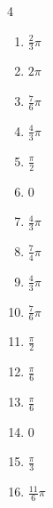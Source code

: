 \begin{multicols}{4}
\begin{enumerate}
  \item $\displaystyle \frac{2}{3}\pi$

  \item $\displaystyle 2\pi$

  \item $\displaystyle \frac{7}{6}\pi$

  \item $\displaystyle \frac{4}{3}\pi$

  \item $\displaystyle \frac{\pi}{2}$

  \item $\displaystyle 0$

  \item $\displaystyle \frac{4}{3}\pi$

  \item $\displaystyle \frac{7}{4}\pi$

  \item $\displaystyle \frac{4}{3}\pi$

  \item $\displaystyle \frac{7}{6}\pi$

  \item $\displaystyle \frac{\pi}{2}$

  \item $\displaystyle \frac{\pi}{6}$

  \item $\displaystyle \frac{\pi}{6}$

  \item $\displaystyle 0$

  \item $\displaystyle \frac{\pi}{3}$

  \item $\displaystyle \frac{11}{6}\pi$


\end{enumerate}
\end{multicols}
